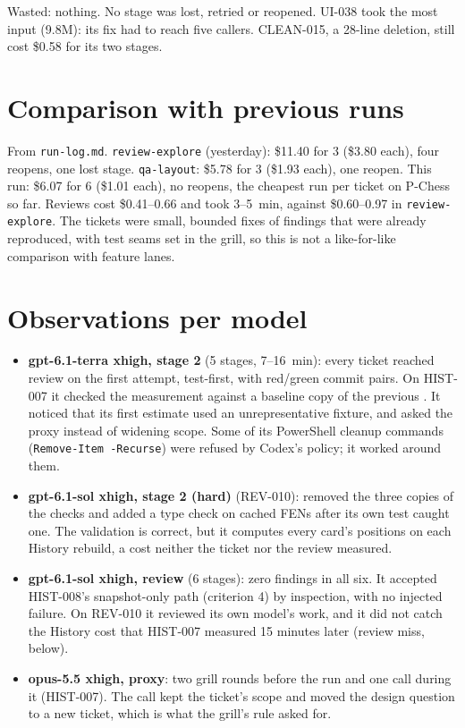 \documentclass[11pt,a4paper]{article}
\begin{document}
Wasted: nothing. No stage was lost, retried or reopened. UI-038 took the most input (9.8M): its
fix had to reach five callers. CLEAN-015, a 28-line deletion, still cost \$0.58 for its two stages.

\section*{Comparison with previous runs}

From \texttt{run-log.md}. \texttt{review-explore} (yesterday): \$11.40 for 3 (\$3.80 each), four
reopens, one lost stage. \texttt{qa-layout}: \$5.78 for 3 (\$1.93 each), one reopen. This run:
\$6.07 for 6 (\$1.01 each), no reopens, the cheapest run per ticket on P-Chess so far. Reviews cost
\$0.41--0.66 and took 3--5~min, against \$0.60--0.97 in \texttt{review-explore}. The tickets were
small, bounded fixes of findings that were already reproduced, with test seams set in the grill,
so this is not a like-for-like comparison with feature lanes.

\section*{Observations per model}

\begin{itemize}
  \item \textbf{gpt-6.1-terra xhigh, stage 2} (5 stages, 7--16~min): every ticket reached review
        on the first attempt, test-first, with red/green commit pairs. On HIST-007 it checked the
        measurement against a baseline copy of the previous . It noticed that
        its first estimate used an unrepresentative fixture, and asked the proxy instead of
        widening scope. Some of its PowerShell cleanup commands (\texttt{Remove-Item -Recurse}) were
        refused by Codex's policy; it worked around them.
  \item \textbf{gpt-6.1-sol xhigh, stage 2 (hard)} (REV-010): removed the three copies of the
        checks and added a type check on cached FENs after its own test caught one. The
        validation is correct, but it computes every card's positions on each History rebuild, a
        cost neither the ticket nor the review measured.
  \item \textbf{gpt-6.1-sol xhigh, review} (6 stages): zero findings in all six. It accepted
        HIST-008's snapshot-only path (criterion 4) by inspection, with no injected failure. On
        REV-010 it reviewed its own model's work, and it did not catch the History cost that
        HIST-007 measured 15 minutes later (review miss, below).
  \item \textbf{opus-5.5 xhigh, proxy}: two grill rounds before the run and one call during it
        (HIST-007). The call kept the ticket's scope and moved the design question to a new ticket,
        which is what the grill's rule asked for.
\end{itemize}
\end{document}
